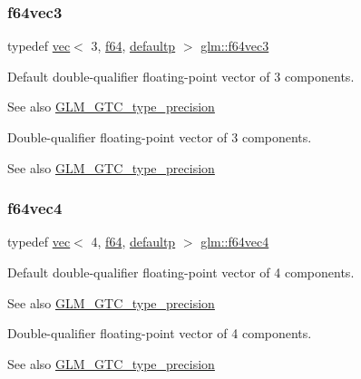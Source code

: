 \subsubsection{\texorpdfstring{f64vec3}{f64vec3}}
{\footnotesize\ttfamily typedef \hyperlink{structglm_1_1vec}{vec}$<$ 3, \hyperlink{group__gtc__type__precision_ga2bba392e555124b36cde6abba349bab3}{f64}, \hyperlink{namespaceglm_a36ed105b07c7746804d7fdc7cc90ff25a9d21ccd8b5a009ec7eb7677befc3bf51}{defaultp} $>$ \hyperlink{group__gtc__type__precision_ga659b65d8792f93da76c2da44f06e0b8b}{glm\+::f64vec3}}

Default double-\/qualifier floating-\/point vector of 3 components. \begin{DoxySeeAlso}{See also}
\hyperlink{group__gtc__type__precision}{G\+L\+M\+\_\+\+G\+T\+C\+\_\+type\+\_\+precision}
\end{DoxySeeAlso}
Double-\/qualifier floating-\/point vector of 3 components. \begin{DoxySeeAlso}{See also}
\hyperlink{group__gtc__type__precision}{G\+L\+M\+\_\+\+G\+T\+C\+\_\+type\+\_\+precision} 
\end{DoxySeeAlso}
\mbox{\label{group__gtc__type__precision_ga41fb27973aedd37b7284789f2f997420}} 
\subsubsection{\texorpdfstring{f64vec4}{f64vec4}}
{\footnotesize\ttfamily typedef \hyperlink{structglm_1_1vec}{vec}$<$ 4, \hyperlink{group__gtc__type__precision_ga2bba392e555124b36cde6abba349bab3}{f64}, \hyperlink{namespaceglm_a36ed105b07c7746804d7fdc7cc90ff25a9d21ccd8b5a009ec7eb7677befc3bf51}{defaultp} $>$ \hyperlink{group__gtc__type__precision_ga41fb27973aedd37b7284789f2f997420}{glm\+::f64vec4}}

Default double-\/qualifier floating-\/point vector of 4 components. \begin{DoxySeeAlso}{See also}
\hyperlink{group__gtc__type__precision}{G\+L\+M\+\_\+\+G\+T\+C\+\_\+type\+\_\+precision}
\end{DoxySeeAlso}
Double-\/qualifier floating-\/point vector of 4 components. \begin{DoxySeeAlso}{See also}
\hyperlink{group__gtc__type__precision}{G\+L\+M\+\_\+\+G\+T\+C\+\_\+type\+\_\+precision} 
\end{DoxySeeAlso}
\mbox{\label{group__gtc__type__precision_ga814f2f65354b6588b067cc5c67a6b340}} 
